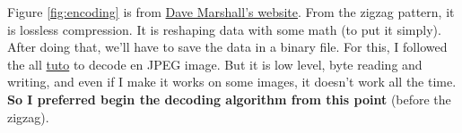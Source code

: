 Figure \ref{fig:encoding} is from \href{https://users.cs.cf.ac.uk/Dave.Marshall/Multimedia/node234.html}{Dave Marshall's website}.
From the zigzag pattern, it is lossless compression. It is reshaping data with some
math (to put it simply).
After doing that, we'll have to save the data in a binary file.
For this, I followed the all \href{https://yasoob.me/posts/understanding-and-writing-jpeg-decoder-in-python}{tuto} to decode en JPEG image.
But it is low level, byte reading and writing, and even if I make it works on some
images, it doesn't work all the time.
\textbf{So I preferred begin the decoding algorithm from this point} (before the zigzag).


